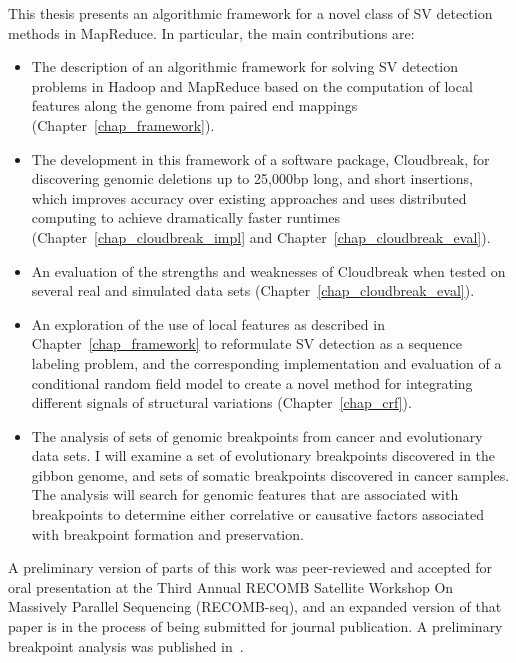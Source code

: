 This thesis presents an algorithmic framework for a novel class of SV detection methods in MapReduce. In particular, the main contributions are:

\begin{itemize}
 \item The description of an algorithmic framework for solving SV detection problems in Hadoop and MapReduce based on the computation of local features along the genome from paired end mappings (Chapter~\ref{chap_framework}).
 \item The development in this framework of a software package, Cloudbreak, for discovering genomic deletions up to 25,000bp long, and short insertions, which improves accuracy over existing approaches and uses distributed computing to achieve dramatically faster runtimes (Chapter~\ref{chap_cloudbreak_impl} and Chapter~\ref{chap_cloudbreak_eval}).
 \item An evaluation of the strengths and weaknesses of Cloudbreak when tested on several real and simulated data sets (Chapter~\ref{chap_cloudbreak_eval}).
 \item An exploration of the use of local features as described in Chapter~\ref{chap_framework} to reformulate SV detection as a sequence labeling problem, and the corresponding implementation and evaluation of a conditional random field model to create a novel method for integrating different signals of structural variations (Chapter~\ref{chap_crf}).
 \item The analysis of sets of genomic breakpoints from cancer and evolutionary data sets. I will examine a set of evolutionary breakpoints discovered in the gibbon genome, and sets of somatic breakpoints discovered in cancer samples. The analysis will search for genomic features that are associated with breakpoints to determine either correlative or causative factors associated with breakpoint formation and preservation.
\end{itemize}

A preliminary version of parts of this work was peer-reviewed and accepted for oral presentation at the Third Annual RECOMB Satellite Workshop On Massively Parallel Sequencing (RECOMB-seq), and an expanded version of that paper is in the process of being submitted for journal publication. A preliminary breakpoint analysis was published in~\cite{Capozzi:2012bb}.
